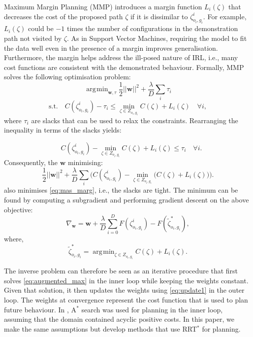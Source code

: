\documentclass[letterpaper, 10 pt, conference]{ieeeconf}
\DeclareMathOperator*{\argmin}{\arg\!\min}
\begin{document}
Maximum Margin Planning (MMP) \cite{ratliff2006maximum} introduces a margin function $L_i(\zeta)$ that decreases the cost of the proposed path $\zeta$ if it is dissimilar to $\zeta^i_{o_i,g_i}$. For example, $L_i(\zeta)$ could be $-1$ times the number of configurations in the demonstration path not visited by $\zeta$. As in Support Vector Machines, requiring the model to fit the data well even in the presence of a margin improves generalisation. Furthermore, the margin helps address the ill-posed nature of IRL, i.e., many cost functions are consistent with the demonstrated behaviour. Formally, MMP solves the following optimisation problem:
\begin{equation}
	\argmin_{\mathbf{w},\tau} \frac{1}{2}||\mathbf{w}||^2 + \frac{\lambda}{D} \sum_i \tau_i \label{eq:mas_marg}
\end{equation}
\begin{equation}
	\text{s.t.} \quad C(\zeta^i_{o_i,g_i}) - \tau_i \leq \min_{\zeta \in Z_{o_i,g_i}} C(\zeta) + L_i(\zeta) \quad \forall i,
\end{equation}
where $\tau_i$ are slacks that can be used to relax the constraints. Rearranging the inequality in terms of the slacks yields:

\begin{equation}
	 \quad C(\zeta^i_{o_i,g_i}) - \min_{\zeta \in Z_{o_i,g_i}} C(\zeta) + L_i(\zeta)  \leq \tau_i  \quad \forall i.
\end{equation}
Consequently, the $\mathbf{w}$ minimising:
\begin{equation}
	\frac{1}{2}||\mathbf{w}||^2 + \frac{\lambda}{D} \sum_i \big( C(\zeta^i_{o_i,g_i}) - \min_{\zeta \in Z_{o_i,g_i}}\big(C(\zeta) + L_i(\zeta)\big) \big) \big. \label{eq:unconstrained}
\end{equation}
also minimises \eqref{eq:mas_marg}, i.e., the slacks are tight.
The minimum can be found by computing a subgradient and performing gradient descent on the above objective:
\begin{equation}
	\nabla_{\mathbf{w}} =\mathbf{w} +  \frac{\lambda}{D} \sum_{i=0}^D F(\zeta^i_{o_i,g_i}) - F(\tilde{\zeta}^*_{o_i,g_i}), \label{eq:update1}
\end{equation}
where,
\begin{equation}
	\tilde{\zeta}^*_{o_i,g_i} = \argmin_{\zeta \in Z_{o_i,g_i}} C(\zeta) + L_i(\zeta). \label{eq:augmented_max}
\end{equation}

The inverse problem can therefore be seen as an iterative procedure that first solves \eqref{eq:augmented_max} in the inner loop while keeping the weights constant. Given that solution, it then updates the weights using \eqref{eq:update1} in the outer loop. The weights at convergence represent the cost function that is used to plan future behaviour. In \cite{ratliff2006maximum}, A$^*$ search was used for planning in the inner loop, assuming that the domain contained acyclic positive costs. In this paper, we make the same assumptions but develop methods that use RRT$^*$ for planning.
\end{document}
